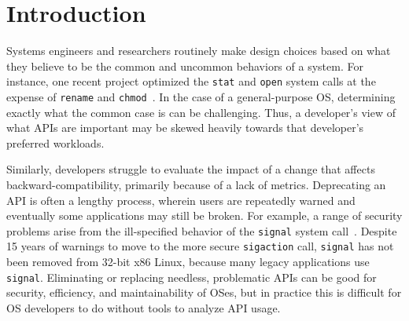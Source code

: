 \section{Introduction}
\label{sec:intro}


Systems engineers and researchers routinely make design choices based on 
what they believe to be the common and uncommon behaviors of a system.
For instance, one recent project optimized the {\tt stat} and {\tt open} system calls
at the expense of {\tt rename} and {\tt chmod}~\citep{tsai15dcache}.
In the case of a general-purpose OS, determining
exactly what the common case is can be challenging.
Thus, a developer's view of what APIs are important
may be skewed heavily towards that developer's preferred workloads.

Similarly, developers struggle to evaluate the impact of a 
change that affects backward-compatibility,
primarily because of a lack of metrics.
Deprecating an API is often a lengthy process, wherein
users are repeatedly warned 
and eventually some applications may still be broken.
For example, a range of security problems arise from the ill-specified behavior of the {\tt signal} system call~\citep{zalewski01signals,cert-signals}.
Despite 15 years of warnings to move to the more secure {\tt sigaction} call,
{\tt signal} has not been removed from 32-bit x86 Linux,
because many legacy applications use {\tt signal}.
Eliminating or replacing needless, problematic APIs 
can be good for security, efficiency, and maintainability of OSes,
but in practice this is difficult for OS developers to do without tools to analyze API usage.

